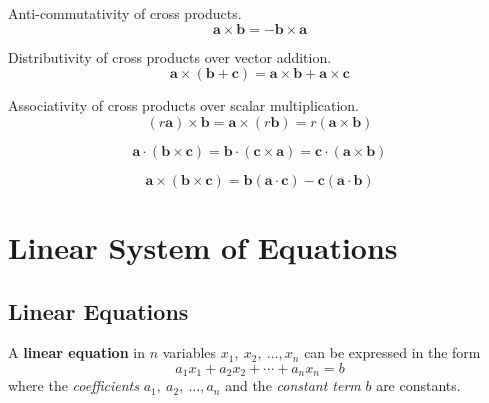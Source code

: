 \documentclass{article}
\begin{document}
\begin{theorem}
    Anti-commutativity of cross products.
    \begin{equation*}
        \symbf{a}\times \symbf{b} = -\symbf{b}\times \symbf{a}
    \end{equation*}
\end{theorem}
\begin{theorem}
    Distributivity of cross products over vector addition.
    \begin{equation*}
        \symbf{a}\times\left( \symbf{b}+\symbf{c} \right) = \symbf{a}\times\symbf{b} + \symbf{a}\times\symbf{c}
    \end{equation*}
\end{theorem}
\begin{theorem}
    Associativity of cross products over scalar multiplication.
    \begin{equation*}
        \left( r \symbf{a}\right)\times\symbf{b} = \symbf{a}\times\left( r \symbf{b} \right) = r\left(\symbf{a}\times\symbf{b}\right)
    \end{equation*}
\end{theorem}
\begin{theorem}
    \begin{equation*}
        \symbf{a} \cdot \left(\symbf{b}\times\symbf{c}\right) = \symbf{b} \cdot \left(\symbf{c}\times\symbf{a}\right) = \symbf{c} \cdot \left(\symbf{a}\times\symbf{b}\right)
    \end{equation*}
\end{theorem}
\begin{theorem}
    \begin{equation*}
        \symbf{a} \times \left(\symbf{b}\times\symbf{c}\right) = \symbf{b} \left(\symbf{a}\cdot\symbf{c}\right) - \symbf{c}\left(\symbf{a}\cdot\symbf{b}\right)
    \end{equation*}
\end{theorem}
\section{Linear System of Equations}
\subsection{Linear Equations}
\begin{definition}
    A \textbf{linear equation} in \(n\) variables
    \(x_1,\: x_2,\: \dots, x_n\) can be expressed in the form
    \begin{equation*}
        a_{1}x_1 + a_{2}x_2 + \cdots + a_{n}x_n = b
    \end{equation*}
    where the \textit{coefficients} \(a_1,\: a_2,\: \dots, a_n\) and the
    \textit{constant term} \(b\) are constants.
\end{definition}
\end{document}
